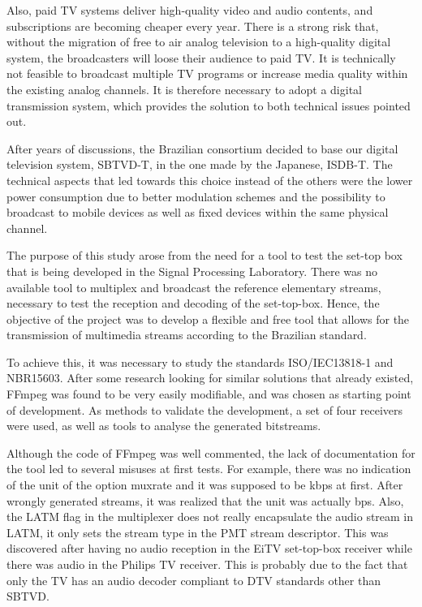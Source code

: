 \documentclass[
	12pt,				%
	openright,			%
	twoside,			%
	a4paper,			%
	brazil,
	french,				%
	english
	]{abntex2}
\begin{document}
Also, paid TV systems deliver high-quality video and audio contents, and subscriptions are becoming cheaper every year. There is a strong risk that, without the migration of free to air analog television to a high-quality digital system, the broadcasters will loose their audience to paid TV. It is technically not feasible to broadcast multiple TV programs or increase media quality within the existing analog channels. It is therefore necessary to adopt a digital transmission system, which provides the solution to both technical issues pointed out.

After years of discussions, the Brazilian consortium decided to base our digital television system, SBTVD-T, in the one made by the Japanese, ISDB-T. The technical aspects that led towards this choice instead of the others were the lower power consumption due to better modulation schemes and the possibility to broadcast to mobile devices as well as fixed devices within the same physical channel.


The purpose of this study arose from the need for a tool to test the set-top box that is being developed in the Signal Processing Laboratory. There was no available tool to multiplex and broadcast the reference elementary streams, necessary to test the reception and decoding of the set-top-box. Hence, the objective of the project was to develop a flexible and free tool that allows for the transmission of multimedia streams according to the Brazilian standard.


To achieve this, it was necessary to study the standards ISO/IEC13818-1 and NBR15603. After some research looking for similar solutions that already existed, FFmpeg was found to be very easily modifiable, and was chosen as starting point of development. As methods to validate the development, a set of four receivers were used, as well as tools to analyse the generated bitstreams.


Although the code of FFmpeg was well commented, the lack of documentation for the tool led to several misuses at first tests. For example, there was no indication of the unit of the option muxrate and it was supposed to be kbps at first. After wrongly generated streams, it was realized that the unit was actually bps. Also, the LATM flag in the multiplexer does not really encapsulate the audio stream in LATM, it only sets the stream type in the PMT stream descriptor. This was discovered after having no audio reception in the EiTV set-top-box receiver while there was audio in the Philips TV receiver. This is probably due to the fact that only the TV has an audio decoder compliant to DTV standards other than SBTVD.
\end{document}

